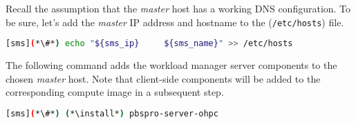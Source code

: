 Recall the assumption that the {\em master} host has a working DNS configuration. To be 
sure, let's add the {\em master} IP address and hostname to the (\texttt{/etc/hosts}) file. 

\begin{lstlisting}[language=bash,keywords={}]
[sms](*\#*) echo "${sms_ip} 	${sms_name}" >> /etc/hosts
\end{lstlisting}

The following command adds the \rms{} workload manager server components to the
chosen {\em master} host. Note that client-side components will be added to
the corresponding compute image in a subsequent step.

\begin{lstlisting}[language=bash,keywords={}]
[sms](*\#*) (*\install*) pbspro-server-ohpc
\end{lstlisting}
